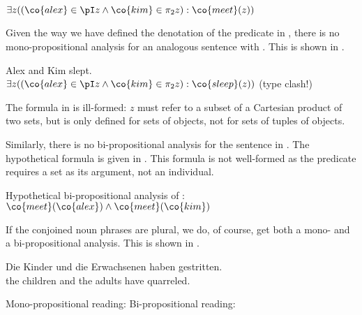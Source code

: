 \documentclass[output=paper]{langsci/langscibook}
\begin{document}
\ea \label{AlexKimTalk-sum}
$\exists z 
((\co{alex} \in \pI z
\land \co{kim} \in \pi_2 z)
: \co{meet}(z))$
\z

Given the way we have defined the denotation of the predicate  in , there is no mono-propositional analysis for an analogous sentence with . 
This is shown in .

\ea \label{AlexKimSleep-sum}
Alex and Kim slept.\\
$\exists z 
((\co{alex} \in \pI z
\land \co{kim} \in \pi_2 z)
: \co{sleep}(z))$
\hspace*{\fill}(type clash!)
\z 

The formula in  is ill-formed: $z$ must refer to a subset of a Cartesian product of two sets, but  is only defined for sets of objects, not for sets of tuples of objects.

Similarly, there is no bi-propositional analysis for the sentence in .
The hypothetical formula is given in .
This formula is not well-formed as the predicate  requires a set as its argument, not an individual.

\ea \label{AlexKimTalk-bi}
Hypothetical bi-propositional analysis of :\\
$\co{meet}(\co{alex}) \land
\co{meet}(\co{kim})
$
\z 

If the conjoined noun phrases are plural, we do, of course, get both a mono- and a bi-propositional analysis. This is shown in .

\ea \label{ex-kinder-erw-streit}
\gll Die Kinder und die Erwachsenen haben gestritten.\\
the children and the adults have quarreled.\\
\begin{xlist}
\ex 
 Mono-propositional reading: 
\ex  Bi-propositional reading: 
\end{xlist}
\z 




\end{document}
